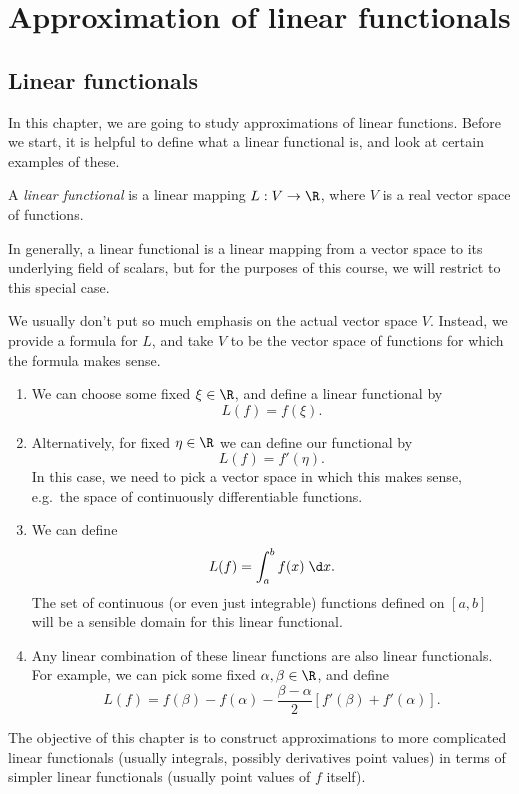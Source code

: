 \documentclass[a4paper]{article}
\begin{document}
\section{Approximation of linear functionals}
\subsection{Linear functionals}
In this chapter, we are going to study approximations of linear functions. Before we start, it is helpful to define what a linear functional is, and look at certain examples of these.

\begin{defi}
  A \emph{linear functional} is a linear mapping $L: V \to \R$, where $V$ is a real vector space of functions.
\end{defi}
In generally, a linear functional is a linear mapping from a vector space to its underlying field of scalars, but for the purposes of this course, we will restrict to this special case.

We usually don't put so much emphasis on the actual vector space $V$. Instead, we provide a formula for $L$, and take $V$ to be the vector space of functions for which the formula makes sense.
\begin{eg}\leavevmode
  \begin{enumerate}
    \item We can choose some fixed $\xi \in \R$, and define a linear functional by
      \[
        L(f) = f(\xi).
      \]
    \item Alternatively, for fixed $\eta \in \R$ we can define our functional by
      \[
        L(f) = f'(\eta).
      \]
      In this case, we need to pick a vector space in which this makes sense, e.g.\ the space of continuously differentiable functions.
    \item We can define
      \[
        L(f) = \int_a^b f(x)\;\d x.
      \]
      The set of continuous (or even just integrable) functions defined on $[a, b]$ will be a sensible domain for this linear functional.
    \item Any linear combination of these linear functions are also linear functionals. For example, we can pick some fixed $\alpha, \beta \in \R$, and define
      \[
        L(f) = f(\beta) - f(\alpha) - \frac{\beta - \alpha}{2} [f'(\beta) + f'(\alpha)].
      \]
  \end{enumerate}
\end{eg}
The objective of this chapter is to construct approximations to more complicated linear functionals (usually integrals, possibly derivatives point values) in terms of simpler linear functionals (usually point values of $f$ itself).
\end{document}
